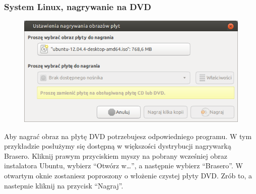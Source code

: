 \subsubsection{System Linux, nagrywanie na DVD}
\begin{figure}
		\includegraphics[width=\linewidth]{images/instalacja_nagrywanie_obrazu_linux_DVD.png}
\end{figure}
Aby nagrać obraz na płytę DVD potrzebujesz odpowiedniego programu. W tym przykładzie posłużymy się dostępną w większości dystrybucji nagrywarką Brasero. Kliknij prawym przyciskiem myszy na pobrany wcześniej obraz instalatora Ubuntu, wybierz “Otwórz w\ldots”, a następnie wybierz “Brasero”. W otwartym oknie zostaniesz poproszony o włożenie czystej płyty DVD. Zrób to, a nastepnie kliknij na przycisk “Nagraj”.
\clearpage
